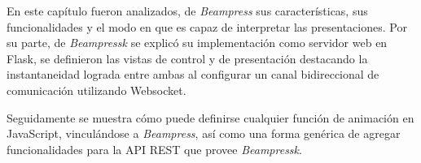 			

	En este capítulo fueron analizados, de \textit{Beampress} sus características, sus funcionalidades y el modo en que es capaz de interpretar las presentaciones. Por su parte, de \textit{Beampressk} se explicó su implementación como servidor web en Flask, se definieron las vistas de control y de presentación destacando la instantaneidad lograda entre ambas al configurar un canal bidireccional de comunicación utilizando Websocket.

	Seguidamente se muestra cómo puede definirse cualquier función de animación en JavaScript, vinculándose a \textit{Beampress}, así como una forma genérica de agregar funcionalidades para la API REST que provee \textit{Beampressk}.
		
